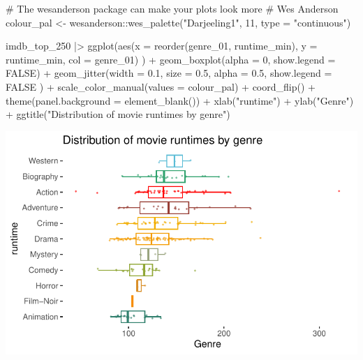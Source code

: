 \documentclass[
  letterpaper,
]{krantz}
\makeatletter
\newenvironment{Shaded}{\begin{snugshade}}{\end{snugshade}}
\newcommand{\AttributeTok}[1]{\textcolor[rgb]{0.40,0.45,0.13}{#1}}
\newcommand{\CommentTok}[1]{\textcolor[rgb]{0.37,0.37,0.37}{#1}}
\newcommand{\ConstantTok}[1]{\textcolor[rgb]{0.56,0.35,0.01}{#1}}
\newcommand{\DecValTok}[1]{\textcolor[rgb]{0.68,0.00,0.00}{#1}}
\newcommand{\FloatTok}[1]{\textcolor[rgb]{0.68,0.00,0.00}{#1}}
\newcommand{\FunctionTok}[1]{\textcolor[rgb]{0.28,0.35,0.67}{#1}}
\newcommand{\NormalTok}[1]{\textcolor[rgb]{0.00,0.23,0.31}{#1}}
\newcommand{\OtherTok}[1]{\textcolor[rgb]{0.00,0.23,0.31}{#1}}
\newcommand{\SpecialCharTok}[1]{\textcolor[rgb]{0.37,0.37,0.37}{#1}}
\newcommand{\StringTok}[1]{\textcolor[rgb]{0.13,0.47,0.30}{#1}}
\newenvironment{kframe}{%
\medskip{}
\setlength{\fboxsep}{.8em}
 \def\at@end@of@kframe{}%
 \ifinner\ifhmode%
  \def\at@end@of@kframe{\end{minipage}}%
  \begin{minipage}{\columnwidth}%
 \fi\fi%
 \def\FrameCommand##1{\hskip\@totalleftmargin \hskip-\fboxsep
 \colorbox{shadecolor}{##1}\hskip-\fboxsep
     \hskip-\linewidth \hskip-\@totalleftmargin \hskip\columnwidth}%
 \MakeFramed {\advance\hsize-\width
   \@totalleftmargin\z@ \linewidth\hsize
   \@setminipage}}%
 {\par\unskip\endMakeFramed%
 \at@end@of@kframe}
\renewenvironment{Shaded}{\begin{kframe}}{\end{kframe}}
\makeatother
\begin{document}
\begin{Shaded}
\begin{Highlighting}[]
\CommentTok{\# The wesanderson package can make your plots look more}
\CommentTok{\# \textquotesingle{}Wes Anderson\textquotesingle{}}
\NormalTok{colour\_pal }\OtherTok{\textless{}{-}}\NormalTok{ wesanderson}\SpecialCharTok{::}\FunctionTok{wes\_palette}\NormalTok{(}\StringTok{"Darjeeling1"}\NormalTok{, }\DecValTok{11}\NormalTok{, }\AttributeTok{type =} \StringTok{"continuous"}\NormalTok{)}

\NormalTok{imdb\_top\_250 }\SpecialCharTok{|\textgreater{}}
  \FunctionTok{ggplot}\NormalTok{(}\FunctionTok{aes}\NormalTok{(}\AttributeTok{x =} \FunctionTok{reorder}\NormalTok{(genre\_01, runtime\_min),}
             \AttributeTok{y =}\NormalTok{ runtime\_min,}
             \AttributeTok{col =}\NormalTok{ genre\_01)}
\NormalTok{         ) }\SpecialCharTok{+}
  \FunctionTok{geom\_boxplot}\NormalTok{(}\AttributeTok{alpha =} \DecValTok{0}\NormalTok{,}
               \AttributeTok{show.legend =} \ConstantTok{FALSE}\NormalTok{) }\SpecialCharTok{+}
  \FunctionTok{geom\_jitter}\NormalTok{(}\AttributeTok{width =} \FloatTok{0.1}\NormalTok{,}
              \AttributeTok{size =} \FloatTok{0.5}\NormalTok{,}
              \AttributeTok{alpha =} \FloatTok{0.5}\NormalTok{,}
              \AttributeTok{show.legend =} \ConstantTok{FALSE}
\NormalTok{              ) }\SpecialCharTok{+}
  \FunctionTok{scale\_color\_manual}\NormalTok{(}\AttributeTok{values =}\NormalTok{ colour\_pal) }\SpecialCharTok{+}
  \FunctionTok{coord\_flip}\NormalTok{() }\SpecialCharTok{+}
  \FunctionTok{theme}\NormalTok{(}\AttributeTok{panel.background =} \FunctionTok{element\_blank}\NormalTok{()) }\SpecialCharTok{+}
  \FunctionTok{xlab}\NormalTok{(}\StringTok{"runtime"}\NormalTok{) }\SpecialCharTok{+}
  \FunctionTok{ylab}\NormalTok{(}\StringTok{"Genre"}\NormalTok{) }\SpecialCharTok{+}
  \FunctionTok{ggtitle}\NormalTok{(}\StringTok{"Distribution of movie runtimes by genre"}\NormalTok{)}
\end{Highlighting}
\end{Shaded}

\includegraphics{09_sources_of_bias_files/figure-pdf/final-plot-outliers-1.pdf}
\end{document}
